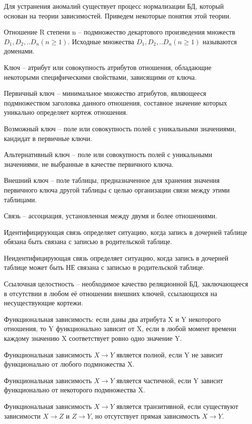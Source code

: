 Для устранения аномалий существует процесс нормализации БД, который основан на теории зависимостей. Приведем некоторые понятия этой теории.

Отношение R степени n -- подмножество декартового произведения множеств $D_1, D_2,.. D_n (n \ge 1)$. Исходные множества $D_1, D_2,.. D_n (n \ge 1)$ называются доменами.

Ключ -- атрибут или совокупность атрибутов отношения, обладающие некоторыми специфическими свойствами, зависящими от ключа.

Первичный ключ -- минимальное множество атрибутов,
являющееся подмножеством заголовка данного отношения, составное значение которых уникально определяет кортеж отношения.

Возможный ключ -- поле или совокупность полей с уникальными значениями, кандидат в первичные ключи.

Альтернативный ключ -- поле или совокупность полей с
уникальными значениями, не выбранные в качестве первичного ключа.

Внешний ключ -- поле таблицы, предназначенное для хранения значения первичного ключа другой таблицы с целью организации связи между этими таблицами.

Связь -- ассоциация, установленная между двумя и более отношениями.

Идентифицирующая связь определяет ситуацию, когда запись в дочерней таблице обязана быть связана с записью в родительской таблице.

Неидентифицирующая связь определяет ситуацию, когда запись в дочерней таблице может быть НЕ связана с записью в родительской таблице.

Ссылочная целостность -- необходимое качество реляционной БД, заключающееся в отсутствии в любом её отношении внешних ключей, ссылающихся на несуществующие кортежи.

Функциональная зависимость: если даны два атрибута X и Y некоторого отношения, то Y функционально зависит от X, если в любой момент времени каждому значению X соответствует ровно одно значение Y.

Функциональная зависимость $X \rightarrow Y$ является полной, если Y не зависит функционально от любого подмножества X.

Функциональная зависимость $X \rightarrow Y$ является частичной, если Y зависит функционально от некоторого подмножества X.

Функциональная зависимость $X \rightarrow Y$ является транзитивной, если существуют зависимости $X \rightarrow Z$ и $Z \rightarrow Y$, но отсутствует прямая зависимость $X \rightarrow Y$.

